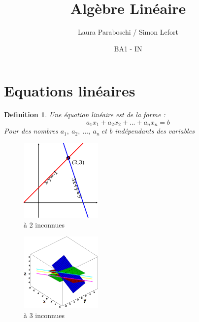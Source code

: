\documentclass{article}
\title{Algèbre Linéaire}
\author{Laura Paraboschi / Simon Lefort }
\date{BA1 - IN}
\newtheorem{definition}{Definition}[section]
\begin{document}
\maketitle

\section{Equations linéaires}
\begin{definition}
    Une équation linéaire est de la forme :
    \[ a_1x_1 + a_2x_2 + ... + a_nx_n = b \]
    Pour des nombres \( a_1, \ a_2, \ ..., \ a_n \ \)et b indépendants des variables
\end{definition}
\begin{multicols}{2}
    \begin{figure}[h]
        \centering
        \includegraphics[width=4cm]{Images/1200px-Intersecting_Lines.svg.png}
        \caption{à 2 inconnues}
        \label{fig:Graphe 2 inconnues}
    \end{figure}
\columnbreak
    \begin{figure}[h]
        \centering
        \includegraphics[width=4cm]{Images/Plans.png}
        \caption{à 3 inconnues}
        \label{fig:Graphe 2 inconnues}
    \end{figure}
\end{multicols}
\end{document}
